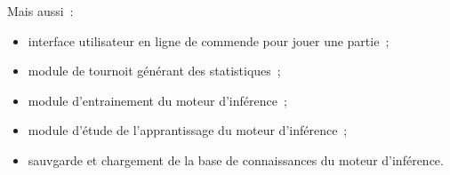 Mais aussi~:

\begin{itemize}

    \item interface utilisateur en ligne de commende pour jouer une partie~;
    \item module de tournoit générant des statistiques~;
    \item module d'entrainement du moteur d'inférence~;
    \item module d'étude de l'apprantissage du moteur d'inférence~;
    \item sauvgarde et chargement de la base de connaissances du moteur d'inférence.

\end{itemize}
